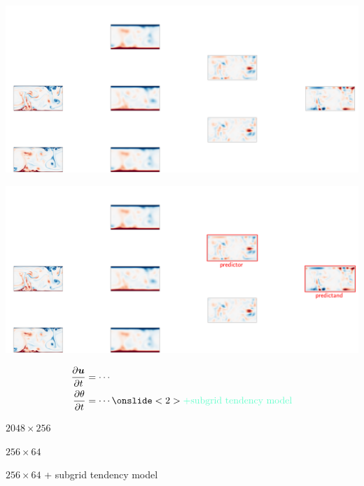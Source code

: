 \documentclass[12pt, aspectratio=169]{beamer}
\newcommand{\pdiff}[2]{\frac{\partial #1}{\partial #2}}
\renewcommand\vec{\bm}
\begin{document}
\begin{frame}
    \centering
    \includegraphics[width=\linewidth]{figures/method7.pdf}
\end{frame}

\begin{frame}
    \centering
    \includegraphics[width=\linewidth]{figures/method9.pdf}
\end{frame}

\begin{frame}
    \begin{align*}
        \pdiff{\vec{u}}{t} &= \cdots \\
        \pdiff{\theta}{t} &= \cdots \onslide<2>{\color{hilight} + \text{subgrid tendency model}}
    \end{align*}
\end{frame}

\begin{frame}
    \begin{description}[align=right, labelwidth=0.5cm]
        \item[Truth] $2048 \times 256$
        \item[Control]  $256 \times 64$
        \item[Parametrised]  $256 \times 64$ + subgrid tendency model
    \end{description}
\end{frame}
\end{document}
